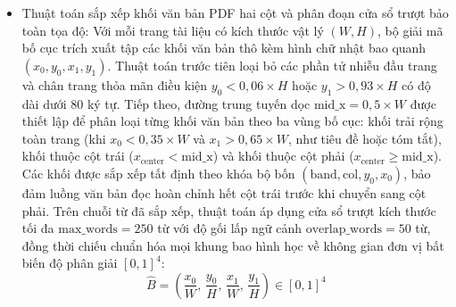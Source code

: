 \begin{itemize}
    \item Thuật toán sắp xếp khối văn bản PDF hai cột và phân đoạn cửa sổ trượt bảo toàn tọa độ:
    Với mỗi trang tài liệu có kích thước vật lý $(W, H)$, bộ giải mã bố cục trích xuất tập các khối văn bản thô kèm hình chữ nhật bao quanh $(x_0, y_0, x_1, y_1)$. Thuật toán trước tiên loại bỏ các phần tử nhiễu đầu trang và chân trang thỏa mãn điều kiện $y_0 < 0{,}06 \times H$ hoặc $y_1 > 0{,}93 \times H$ có độ dài dưới $80$ ký tự. Tiếp theo, đường trung tuyến dọc $\text{mid\_x} = 0{,}5 \times W$ được thiết lập để phân loại từng khối văn bản theo ba vùng bố cục: khối trải rộng toàn trang (khi $x_0 < 0{,}35 \times W$ và $x_1 > 0{,}65 \times W$, như tiêu đề hoặc tóm tắt), khối thuộc cột trái ($x_{\text{center}} < \text{mid\_x}$) và khối thuộc cột phải ($x_{\text{center}} \ge \text{mid\_x}$). Các khối được sắp xếp tất định theo khóa bộ bốn $(\text{band}, \text{col}, y_0, x_0)$, bảo đảm luồng văn bản đọc hoàn chỉnh hết cột trái trước khi chuyển sang cột phải. Trên chuỗi từ đã sắp xếp, thuật toán áp dụng cửa sổ trượt kích thước tối đa $\text{max\_words} = 250$ từ với độ gối lấp ngữ cảnh $\text{overlap\_words} = 50$ từ, đồng thời chiếu chuẩn hóa mọi khung bao hình học về không gian đơn vị bất biến độ phân giải $[0, 1]^4$:
    \begin{equation}
    \label{eq:bbox_unit_projection}
    \hat{B} = \left(\frac{x_0}{W},\, \frac{y_0}{H},\, \frac{x_1}{W},\, \frac{y_1}{H}\right) \in [0, 1]^4
    \end{equation}


\end{itemize}

